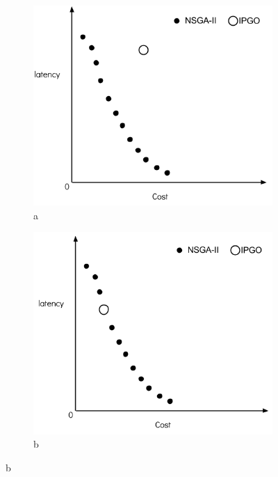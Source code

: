 \documentclass{llncs}
\begin{document}
\begin{figure}[H]
	\centering
	\begin{subfigure}[b]{0.4\textwidth}
		\includegraphics[width=\textwidth]{pics/1.png}
		\caption{a}
	\end{subfigure}%
	\begin{subfigure}[b]{0.4\textwidth}
		\includegraphics[width=\textwidth]{pics/2.png}
		\caption{b}
	\end{subfigure}



\end{figure}
\end{document}
